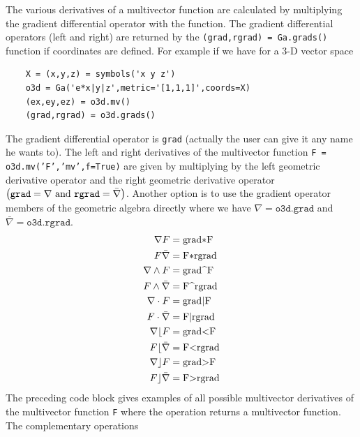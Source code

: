 \documentclass[12pt,twoside,openright]{memoir}
\newcommand{\lp}{\left (}
\newcommand{\rp}{\right )}
\newcommand{\W}{\wedge}
\newcommand{\paren}[1]{\lp {#1} \rp}
\newcommand{\T}[1]{\texttt{#1}}
\begin{document}
The various derivatives of a multivector function are calculated by
multiplying the gradient differential operator with the function.  The gradient
differential operators (left and right) are returned by the \T{(grad,rgrad) = Ga.grads()} function if coordinates
are defined.  For example if we have for a 3-D vector space
\begin{lstlisting}
    X = (x,y,z) = symbols('x y z')
    o3d = Ga('e*x|y|z',metric='[1,1,1]',coords=X)
    (ex,ey,ez) = o3d.mv()
    (grad,rgrad) = o3d.grads()
\end{lstlisting}
The gradient differential operator is \T{grad} (actually the user can give
it any name he wants to).  The left and right derivatives of the multivector
function \T{F = o3d.mv('F','mv',f=True)} are given by multiplying by the
left geometric derivative operator and the right geometric derivative operator
$\paren{\mbox{\T{grad}} = \nabla\mbox{ and } \mbox{\T{rgrad}} = \bar{\nabla}}$.  Another option 
is to use the gradient operator members of the geometric algebra directly where we have
$\nabla = \T{o3d.grad}$ and $\bar{\nabla} = \T{o3d.rgrad}$.
      \begin{align}
            \nabla F &=  \mbox{\lstinline!grad*F!} \\
            F \bar{\nabla} &=  \mbox{\lstinline!F*rgrad!} \\
            \nabla \W F &=  \mbox{\lstinline!grad^F!} \\
            F \W \bar{\nabla} &=  \mbox{\lstinline!F^rgrad!} \\
            \nabla \cdot F &=  \mbox{\lstinline!grad|F!} \\
            F \cdot \bar{\nabla} &=  \mbox{\lstinline!F|rgrad!} \\
            \nabla \lfloor F &=  \mbox{\lstinline!grad<F!} \\
            F \lfloor \bar{\nabla} &=  \mbox{\lstinline!F<rgrad!} \\
            \nabla \rfloor F &=  \mbox{\lstinline!grad>F!} \\
            F \rfloor \bar{\nabla} &= \mbox{\lstinline!F>rgrad!}
      \end{align}
The preceding code block gives examples of all possible multivector
derivatives of the multivector function \T{F} where the operation returns
a multivector function. The complementary operations
\end{document}
